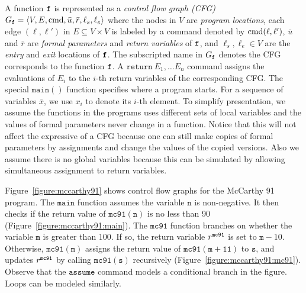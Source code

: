 A function $\mathtt{{f}}$ is represented as a \emph{control flow graph (CFG)} $G_{\mathtt{{f}}} = \langle
V, E,\textmd{cmd},\bar{u}, \bar{r},  \ell_s,  \ell_e\rangle$ where the nodes in $V$ are \emph{program locations},
each edge $(\ell, \ell')$ in $E \subseteq V \times V$ is labeled by a
command denoted by $\textmd{cmd} (\ell, \ell')$, $\bar{u}$ and $\bar{r}$ are \emph{formal parameters} and \emph{return variables} of $\mathtt{{f}}$, and $\ell_s,  \ell_e \in V$ are the \emph{entry} and \emph{exit} locations of $\mathtt{{f}}$. The subscripted name in $G_{\mathtt{{f}}}$ denotes the CFG corresponds to the function $\mathtt{{f}}$.
A $\mathtt{return}\ E_1, \ldots E_n$ command assigns the evaluations of $E_i$ to the $i$-th return variables of the corresponding CFG.
The special $\mathtt{main()}$ function specifies where a program starts.
For a sequence of variables $\bar{x}$, we use $x_i$ to denote its $i$-th element. To simplify presentation, we assume the functions in the programs uses different sets of local variables and the values of formal parameters never change in a function. Notice that this will not affect the expressive of a CFG because one can still make copies of formal parameters by assignments and change the values of the copied versions. Also we assume there is no global variables because this can be simulated by allowing simultaneous assignment to return variables. 

Figure~\ref{figure:mccarthy91} shows control flow graphs for the
McCarthy 91 program. The $\mathtt{main}$ function assumes the
variable $\mathtt{n}$ is non-negative. It then checks if the return
value of $\mathtt{mc91(n)}$ is no less than 90
(Figure~\ref{figure:mccarthy91:main}). The $\mathtt{mc91}$ function
branches on whether the variable $\mathtt{m}$ is greater than 100. If
so, the return variable $r^{\mathtt{{mc91}}}$ is set to $\mathtt{m} -
10$. Otherwise, 
$\mathtt{mc91(m)}$ assigns the return value of $\mathtt{mc91(m + 11)}$
to $\mathtt{s}$, and updates $r^{\mathtt{{mc91}}}$ by calling
$\mathtt{mc91(s)}$ recursively
(Figure~\ref{figure:mccarthy91:mc91}). Observe that the 
$\mathtt{assume}$ command models a conditional branch in the
figure. Loops can be modeled similarly.

